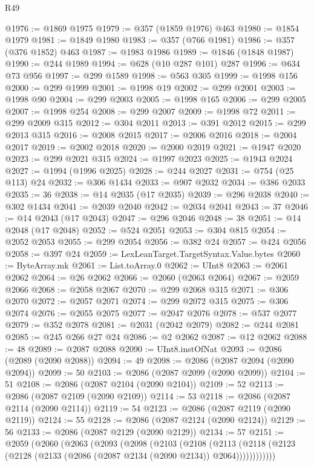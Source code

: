 \begin{lexlean}{R49}
\begin{coremodule}
@1976 := @1869 @1975
@1979 := @357 (@1859 @1976) @463
@1980 := @1854 @1979
@1981 := @1849 @1980
@1983 := @357 (@766 @1981)
@1986 := @357 (@376 @1852) @463
@1987 := @1983 @1986
@1989 := @1846 (@1848 @1987)
@1990 := @244 @1989
@1994 := @628 (@10 @287 @101) @287
@1996 := @634 @73 @956
@1997 := @299 @1589
@1998 := @563 @305
@1999 := @1998 @156
@2000 := @299 @1999
@2001 := @1998 @19
@2002 := @299 @2001
@2003 := @1998 @90
@2004 := @299 @2003
@2005 := @1998 @165
@2006 := @299 @2005
@2007 := @1998 @254
@2008 := @299 @2007
@2009 := @1998 @72
@2011 := @299 @2009 @315
@2012 := @304 @2011
@2013 := @391 @2012
@2015 := @299 @2013 @315
@2016 := @2008 @2015
@2017 := @2006 @2016
@2018 := @2004 @2017
@2019 := @2002 @2018
@2020 := @2000 @2019
@2021 := @1947 @2020
@2023 := @299 @2021 @315
@2024 := @1997 @2023
@2025 := @1943 @2024
@2027 := @1994 (@1996 @2025)
@2028 := @244 @2027
@2031 := @754 (@25 @113) @24
@2032 := @306 @1434
@2033 := @907 @2032
@2034 := @386 @2033
@2035 := 36
@2038 := @14 @2035 (@17 @2035)
@2039 := @296 @2038
@2040 := @302 @1434
@2041 := @2039 @2040
@2042 := @2034 @2041
@2043 := 37
@2046 := @14 @2043 (@17 @2043)
@2047 := @296 @2046
@2048 := 38
@2051 := @14 @2048 (@17 @2048)
@2052 := @524 @2051
@2053 := @304 @815
@2054 := @2052 @2053
@2055 := @299 @2054
@2056 := @382 @24
@2057 := @424 @2056
@2058 := @397 @24
@2059 := LexLeanTarget.TargetSyntax.Value.bytes
@2060 := ByteArray.mk
@2061 := List.toArray.{0}
@2062 := UInt8
@2063 := @2061 @2062
@2064 := @26 @2062
@2066 := @2060 (@2063 @2064)
@2067 := @2059 @2066
@2068 := @2058 @2067
@2070 := @299 @2068 @315
@2071 := @306 @2070
@2072 := @2057 @2071
@2074 := @299 @2072 @315
@2075 := @306 @2074
@2076 := @2055 @2075
@2077 := @2047 @2076
@2078 := @537 @2077
@2079 := @352 @2078
@2081 := @2031 (@2042 @2079)
@2082 := @244 @2081
@2085 := @245 @266 @27 @24
@2086 := @2 @2062
@2087 := @12 @2062
@2088 := 48
@2089 := @2087 @2088
@2090 := UInt8.instOfNat
@2093 := @2086 (@2089 (@2090 @2088))
@2094 := 49
@2098 := @2086 (@2087 @2094 (@2090 @2094))
@2099 := 50
@2103 := @2086 (@2087 @2099 (@2090 @2099))
@2104 := 51
@2108 := @2086 (@2087 @2104 (@2090 @2104))
@2109 := 52
@2113 := @2086 (@2087 @2109 (@2090 @2109))
@2114 := 53
@2118 := @2086 (@2087 @2114 (@2090 @2114))
@2119 := 54
@2123 := @2086 (@2087 @2119 (@2090 @2119))
@2124 := 55
@2128 := @2086 (@2087 @2124 (@2090 @2124))
@2129 := 56
@2133 := @2086 (@2087 @2129 (@2090 @2129))
@2134 := 57
@2151 := @2059
    (@2060
      (@2063
        (@2093
          (@2098
            (@2103
              (@2108
                (@2113
                  (@2118 (@2123 (@2128 (@2133 (@2086 (@2087 @2134 (@2090 @2134)) @2064))))))))))))

\end{coremodule}
\end{lexlean}
